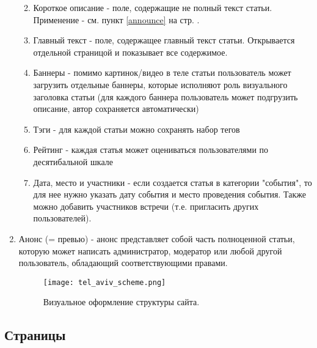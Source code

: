 \documentclass[DIV=calc, paper=a4, fontsize=11pt]{scrartcl} %
\begin{document}
\begin{enumerate}
\begin{enumerate}
\begin{figure}[ht!]
        \end{figure}
    \item{Короткое описание} - поле, содержащие не полный текст статьи. Применение - см. пункт \ref{announce} на стр. \pageref{announce}.
    \item{Главный текст} - поле, содержащее главный текст статьи. Открывается отдельной страницой и показывает все содержимое.
    \item{Баннеры} - помимо картинок/видео в теле статьи пользователь может загрузить отдельные баннеры, которые исполняют роль визуального заголовка статьи (для каждого баннера пользователь может подгрузить описание, автор сохраняется автоматически)
    \item{Тэги} - для каждой статьи можно сохранять набор тегов
    \item{Рейтинг} - каждая статья может оцениваться пользователями по десятибальной шкале
    \item{Дата, место и участники} - если создается статья в категории "события", то для нее нужно указать дату события и место проведения события. Также можно добавить участников встречи (т.е. пригласить других пользователей). 
    \end{enumerate}
\item \label{announce}{Анонс} (= превью) - анонс представляет собой часть полноценной статьи, которую может написать администратор, модератор или любой другой пользователь, обладающий соответствующими правами.

        \begin{figure}[H]
        \centering
        \texttt{[image: tel\_aviv\_scheme.png]}
        \caption{Визуальное оформление структуры сайта. \label{fig:tel_aviv_scheme.png}}
        \end{figure}

\end{enumerate}

\subsection{Страницы}
\end{document}
